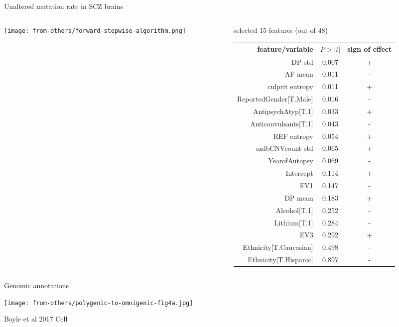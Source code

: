 \documentclass[usenames,dvipsnames]{beamer}
\begin{document}
\begin{frame}{Unaltered mutation rate in SCZ brains}
\begin{columns}[t]
\begin{column}{0.5\textwidth}

\texttt{[image: from-others/forward-stepwise-algorithm.png]}
\end{column}

\begin{column}{0.5\textwidth}
\begin{center}
\small
selected 15 features (out of 48)
\end{center}
\tiny
\begin{tabular}{rcc}
	feature/variable & \(P>|t|\) & sign of effect \\
\hline
DP std & 0.007 & + \\
AF mean & 0.011 & - \\
culprit entropy & 0.011 & + \\
ReportedGender[T.Male] & 0.016 & - \\
AntipsychAtyp[T.1] & 0.033 & + \\
Anticonvulsants[T.1] & 0.043 & - \\
REF entropy & 0.054 & + \\
szdbCNVcount std & 0.065 & + \\
YearofAutopsy & 0.069 & - \\
Intercept & 0.114 & + \\
EV1 & 0.147 & - \\
DP mean & 0.183 & + \\
Alcohol[T.1] & 0.252 & - \\
Lithium[T.1] & 0.284 & - \\
EV3 & 0.292 & + \\
Ethnicity[T.Caucasian] & 0.498 & - \\
Ethnicity[T.Hispanic] & 0.897 & - \\
\end{tabular}
\end{column}
\end{columns}
\end{frame}

\begin{frame}{Genomic annotations}

\end{frame}

\begin{frame}
\texttt{[image: from-others/polygenic-to-omnigenic-fig4a.jpg]}

{\tiny Boyle et al 2017 Cell}
\end{frame}
\end{document}
